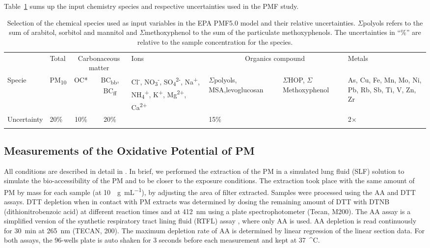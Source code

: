 \documentclass[acp, manuscript]{copernicus}
\begin{document}
Table~\ref{tab:PMFentry} sums up the input chemistry species and respective uncertainties
used in the PMF study.
\begin{table}
    \centering
    \caption{Selection of the chemical species used as input variables in the EPA PMF5.0
        model and their relative uncertainties. $\Sigma$polyols refers to the sum of
        arabitol, sorbitol and mannitol and $\Sigma$methoxyphenol to the sum of the
        particulate methoxyphenols.  The uncertainties in ``\%'' are relative to
        the sample concentration for the species.}
    \begin{tabularx}{\textwidth}{Xlccm{2.7cm}m{1.5cm}m{2.6cm}m{3cm}}
        \tophline
        & Total & \multicolumn{2}{c}{Carbonaceous matter} & Ions &
        \multicolumn{2}{c}{Organics compound} & Metals\\
        \middlehline
        Specie & PM\textsubscript{10} & OC* &
        BC\textsubscript{bb}, BC\textsubscript{ff} & Cl\textsuperscript{-},
        NO\textsubscript{3}\textsuperscript{-},
        SO\textsubscript{4}\textsuperscript{2-}, Na\textsuperscript{+},
        NH\textsubscript{4}\textsuperscript{+}, K\textsuperscript{+},
        Mg\textsuperscript{2+}, Ca\textsuperscript{2+} &
        $\Sigma$polyols, MSA,\newline levoglucosan &
        $\Sigma$HOP, $\Sigma$Methoxyphenol &
        As, Cu, Fe, Mn, Mo, Ni, Pb, Rb, Sb, Ti, V, Zn, Zr
        \\
        Uncertainty & 20\% & 10\% & 20\% & \citet{gianini_source_2013} &
        15\% & \citet{gianini_source_2013} & 2$\times$\citet{gianini_source_2013} \tabularnewline
        \bottomhline
    \end{tabularx}
    \label{tab:PMFentry}
\end{table}


\subsection{Measurements of the Oxidative Potential of
PM}\label{measurements-of-the-oxidative-potential-of-pm}

All conditions are described in detail in \citet{calas_importance_2017}. In
brief, we performed the extraction of the PM in a simulated lung fluid (SLF)
solution to simulate the bio-accessibility of the PM and to be closer to the
exposure conditions. The extraction took place with the same amount of PM by
mass for each sample (at 10~\unit{\mu g~mL^{-1}}), by adjusting the area of filter
extracted. Samples were processed using the AA and DTT assays. DTT depletion
when in contact with PM extracts was determined by dosing the remaining amount
of DTT with DTNB (dithionitrobenzoic acid) at different reaction times and at
412~\unit{nm} using a plate spectrophotometer (Tecan, M200). The AA assay is a
simplified version of the synthetic respiratory tract lining fluid (RTFL) assay
\citep{kelly_protein_2003}, where only AA is used. AA depletion is read
continuously for 30~\unit{min} at 265~\unit{nm} (TECAN, 200). The maximum depletion rate of AA
is determined by linear regression of the linear section data. For both assays,
the 96-wells plate is auto shaken for 3 seconds before each measurement and kept
at 37~\unit{^\circ C}.
\end{document}
